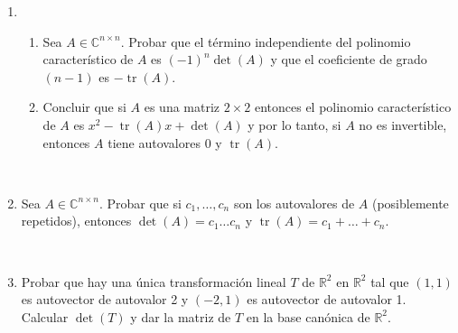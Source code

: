 \documentclass[11pt,spanish,makeidx]{amsbook}
\newcommand\R{\mathbb{R}}
\newcommand\C{\mathbb{C}}
\newcommand\tr{\operatorname{tr}}
\begin{document}
\begin{enumerate}
	\
	
	\item \begin{enumerate}
		\item Sea $A\in\C^{n\times n}$. Probar que el t\'ermino independiente del
		polinomio caracter\'istico de $A$ es $(-1)^n\det(A)$ y que el coeficiente
		de grado $(n-1)$ es $-\tr(A)$.
		\item Concluir que si $A$ es una matriz $2 \times 2$ entonces el polinomio caracter\'istico de $A$ es
		$x^2-\tr(A)x+\det(A)$ y por lo tanto, si $A$ no es invertible, entonces $A$ tiene autovalores 0 y
		$\tr(A)$.
	\end{enumerate}
		
	\
	
	\item Sea $A\in\C^{n\times n}$. Probar que si $c_1,\dots,c_n$ son los autovalores de $A$
	(posiblemente repetidos), entonces
	$\det(A)=c_1\dots c_n$ y $\tr(A)=c_1+\dots+c_n$.
		
	\
		
	\item Probar que hay una \'unica transformaci\'on lineal $T$ de $\R^2$ en $\R^2$ tal que
	$(1,1)$ es autovector
	de autovalor 2 y $(-2,1)$ es autovector de autovalor 1. 	Calcular $\det(T)$ y dar la matriz de $T$ en la base can\'onica de $\R^2$.
	
	
\end{enumerate}
\end{document}
